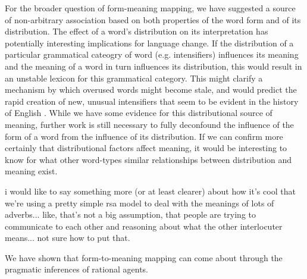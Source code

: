 \documentclass[10pt,letterpaper]{article}
\newcommand{\todo}[1]{{\color{red}#1}}
\begin{document}
For the broader question of form-meaning mapping, we have suggested a source of non-arbitrary association based on both properties of the word form and of its distribution. The effect of a word's distribution on its interpretation has potentially interesting implications for language change. If the distribution of a particular grammatical cateogry of word (e.g. intensifiers) influences its meaning and the meaning of a word in turn influences its distribution, this would result in an unstable lexicon for this grammatical category. This might clarify a mechanism by which overused words might become stale, and would predict the rapid creation of new, unusual intensifiers that seem to be evident in the history of English \cite{bolinger}. While we have some evidence for this distributional source of meaning, further work is still necessary to fully deconfound the influence of the form of a word from the influence of its distribution. If we can confirm more certainly that distributional factors affect meaning, it would be interesting to know for what other word-types similar relationships between distribution and meaning exist.

\todo{i would like to say something more (or at least clearer) about how it's cool that we're using a pretty simple rsa model to deal with the meanings of lots of adverbs... like, that's not a big assumption, that people are trying to communicate to each other and reasoning about what the other interlocuter means... not sure how to put that.}

We have shown that form-to-meaning mapping can come about through the pragmatic inferences of rational agents.
\end{document}
